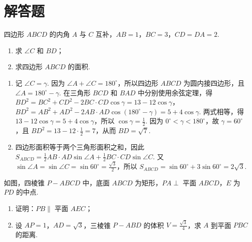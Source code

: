 \section{解答题}

\begin{problem}
四边形 \(ABCD\) 的内角 \(A\) 与 \(C\) 互补，\(AB=1\)，\(BC=3\)，\(CD=DA=2\).
\begin{enumerate}
\item 求 \(\angle C\) 和 \(BD\)；
\item 求四边形 \(ABCD\) 的面积.
\end{enumerate}
\end{problem}

\begin{solution}
\begin{enumerate}
\item 记 \(\angle C=\gamma\). 因为 \(\angle A+\angle C=180^{\circ}\)，所以四边形 \(ABCD\) 为圆内接四边形，且 \(\angle A=180^{\circ}-\gamma\). 在三角形 \(BCD\) 和 \(BAD\) 中分别使用余弦定理，得
\(BD^2=BC^2+CD^2-2BC\cdot CD\cos\gamma=13-12\cos\gamma\)，
\(BD^2=AB^2+AD^2-2AB\cdot AD\cos(180^{\circ}-\gamma)=5+4\cos\gamma\).
两式相等，得 \(13-12\cos\gamma=5+4\cos\gamma\)，所以 \(\cos\gamma=\frac12\). 因为 \(0^{\circ}<\gamma<180^{\circ}\)，故 \(\gamma=60^{\circ}\)，且 \(BD^2=13-12\cdot\frac12=7\)，从而 \(BD=\sqrt7\).
\item 四边形面积等于两个三角形面积之和，因此
\(S_{ABCD}=\frac12 AB\cdot AD\sin\angle A+\frac12 BC\cdot CD\sin\angle C\).
又 \(\sin\angle A=\sin\angle C=\sin60^{\circ}=\frac{\sqrt3}{2}\)，所以 \(S_{ABCD}=\sin60^{\circ}+3\sin60^{\circ}=2\sqrt3\).
\end{enumerate}
\end{solution}

\begin{problem}
如图，四棱锥 \(P-ABCD\) 中，底面 \(ABCD\) 为矩形，\(PA\perp\) 平面 \(ABCD\)，\(E\) 为 \(PD\) 的中点.
\begin{enumerate}
\item 证明：\(PB\parallel\) 平面 \(AEC\)；
\item 设 \(AP=1\)，\(AD=\sqrt{3}\)，三棱锥 \(P-ABD\) 的体积 \(V=\frac{\sqrt{3}}{4}\)，求 \(A\) 到平面 \(PBC\) 的距离.
\end{enumerate}

\FloatBarrier
\end{problem}

